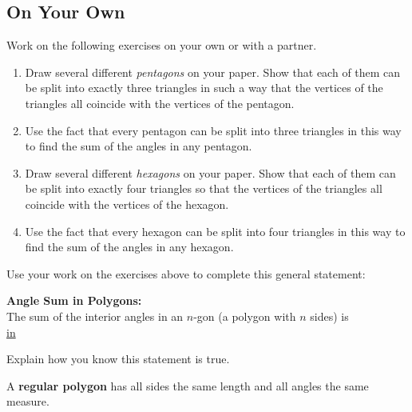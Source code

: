 \bigskip

\subsection*{On Your Own}
Work on the following exercises on your own or with a partner.
\begin{enumerate}
\item
Draw several different \emph{pentagons} on your paper.  Show that each of them can be split into exactly three triangles in such a way that the vertices of the triangles all coincide with the vertices of the pentagon.\\

\item
Use the fact that every pentagon can be split into three triangles in this way to find the sum of the angles in any pentagon.\\

\item
Draw several different \emph{hexagons} on your paper.  Show that each of them can be split into exactly four triangles so that the vertices of the triangles all coincide with the vertices of the hexagon.\\

\item
Use the fact that every hexagon can be split into four triangles in this way to find the sum of the angles in any hexagon.\\

\end{enumerate}

\bigskip
\bigskip

\newpage

\begin{problem}
Use your work on the exercises above to complete this general statement:
\begin{center}
{\bf Angle Sum in Polygons:}\\
The sum of the interior angles in an $n$-gon (a polygon with $n$ sides) is \\
\bigskip
\underline{ in }
\end{center}
Explain how you know this statement is true.
\end{problem}


\bigskip
\bigskip


\begin{define}
A {\bf regular polygon} has all sides the same length and all angles the same measure.  
\end{define}

